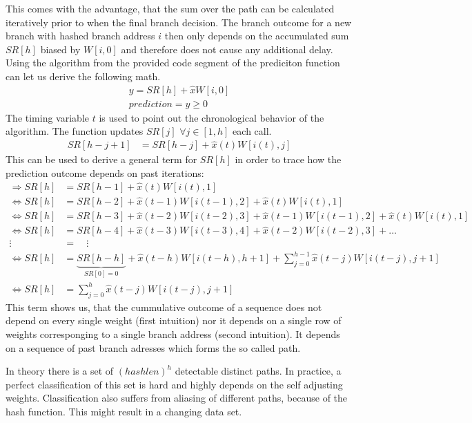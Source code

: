 \documentclass{article}
\begin{document}
This comes with the advantage, that the sum over the path can be calculated iteratively prior to when the final branch decision. The branch outcome for a new branch with hashed branch address $i$ then only depends on the accumulated sum $SR[h]$ biased by $W[i,0]$ and therefore does not cause any additional delay. 
Using the algorithm from the provided code segment of the prediciton function can let us derive the following math.
\begin{align*}
	y = SR[h] + \hat{x} W[i,0] \\
	\textit{prediction} = y\geq 0
\end{align*}
The timing variable $t$ is used to point out the chronological behavior of the algorithm. The function updates $SR[j]$ $\forall j \in [1,h]$ each call.
\begin{align*}
	SR[h-j+1] &= SR[h-j] + \hat{x}(t) W[i(t),j] 
\end{align*}
This can be used to derive a general term for $SR[h]$ in order to trace how the prediction outcome depends on past iterations:
\begin{align*}
	\Rightarrow SR[h] &= SR[h-1] + \hat{x}(t) W[i(t),1] \\
	\iff SR[h] &= SR[h-2] + \hat{x}(t-1) W[i(t-1),2] + \hat{x}(t) W[i(t),1] \\
	\iff SR[h] &= SR[h-3] + \hat{x}(t-2) W[i(t-2),3] + \hat{x}(t-1) W[i(t-1),2] + \hat{x}(t) W[i(t),1] \\
	\iff SR[h] &= SR[h-4] + \hat{x}(t-3) W[i(t-3),4] + \hat{x}(t-2) W[i(t-2),3] + \dots \\%
	\vdots \quad &= \quad \vdots \\
	\iff SR[h] &= \underbrace{SR[h-h]}_{SR[0] = 0} + \hat{x}(t-h) W[i(t-h),h+1] + \sum_{j=0}^{h-1} \hat{x}(t-j) W[i(t-j),j+1] \\
	\iff SR[h] &=\sum_{j=0}^{h} \hat{x}(t-j) W[i(t-j),j+1] 
\end{align*}
This term shows us, that the cummulative outcome of a sequence does not depend on every single weight (first intuition) nor it depends on a single row of weights corresponging to a single branch address (second intuition). It depends on a sequence of past branch adresses which forms the so called path.

In theory there is a set of ${(hashlen)}^{h}$ detectable distinct paths. In practice, a perfect classification of this set is hard and highly depends on the self adjusting weights. Classification also suffers from aliasing of different paths, because of the hash function. This might result in a changing data set. 
\end{document}
